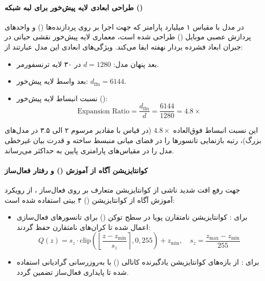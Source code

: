 \item {}

\paragraph*{طراحی ابعادی لایه پیش‌خور برای لبه شبکه ()}
در مدل  \cite{mobilellm2025pro} با مقیاس ۱ میلیارد پارامتر که جهت اجرا بر روی پردازنده‌ها () و واحدهای پردازش عصبی موبایل () طراحی شده است، معماری لایه پیش‌خور نقشی حیاتی در جبران ابعاد فشرده بردار نهفته ایفا می‌کند. ویژگی‌های ابعادی این مدل عبارتند از:
\begin{itemize}
    \item بعد پنهان مدل: $d = 1280$ در ۳۰ لایه ترنسفورمر.
    \item بعد واسط لایه پیش‌خور: $d_{\text{ffn}} = 6144$.
    \item نسبت انبساط لایه پیش‌خور ():
    \begin{equation}
        \text{Expansion Ratio} = \frac{d_{\text{ffn}}}{d} = \frac{6144}{1280} = 4.8\times
    \end{equation}
\end{itemize}
این نسبت انبساط فوق‌العاده $4.8\times$ (در قیاس با مقادیر مرسوم ۲ الی ۳.۵ در مدل‌های بزرگ)، رتبه بازنمایی تانسورها را در فضای میانی منبسط ساخته و قدرت بیان غیرخطی مدل را در مقیاس‌های پارامتری پایین به حداکثر می‌رساند.

\paragraph*{کوانتایزیشن آگاه از آموزش () و رفتار فعال‌ساز}
جهت رفع افت شدید ناشی از کوانتایزیشن متعارف بر روی فعال‌ساز ، از رویکرد آموزش آگاه از کوانتایزیشن () ۴ بیتی استفاده شده است:
\begin{itemize}
    \item برای : کوانتایزیشن نامتقارن پویا در سطح توکن () برای تانسورهای فعال‌سازی اعمال شده تا کران‌های نامتقارن  حفظ گردند:
    \begin{equation}
        Q(z) = s_z \cdot \text{clip}\left(\left\lfloor \frac{z - z_{\min}}{s_z} \right\rceil, 0, 255\right) + z_{\min}, \quad s_z = \frac{z_{\max} - z_{\min}}{255}
    \end{equation}
    \item برای : از بازه‌های کوانتایزیشن یادگیرنده کانالی () با به‌روزرسانی گرادیانی استفاده شده تا پایداری فعال‌ساز تضمین گردد.
\end{itemize}

